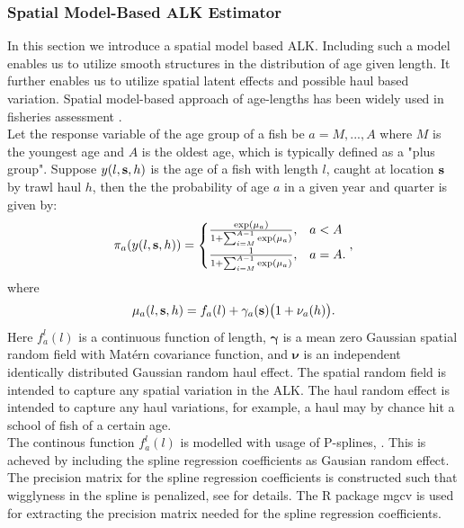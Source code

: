 \documentclass[a4paper 12pt]{article}
\numberwithin{equation}{section}
\begin{document}
\subsubsection{Spatial Model-Based ALK Estimator}
\label{sec:spatialModelALK}
In this section we introduce a spatial model based ALK. Including such a model enables us to utilize smooth structures in the distribution of age given length. It further enables us to utilize spatial latent effects and possible haul based variation. Spatial model-based approach of age-lengths has been widely used in fisheries assessment \citep{berg2012spatial, kvist2000using, rindorf2001analyses}. \\
\indent Let the response variable of the age group of a fish be $a = M,...,A$ where $M$ is the youngest age and $A$ is the oldest age, which is typically defined as a "plus group". Suppose $y(l,{\bf s},h)$ is the age  of a fish with length $l$, caught at location ${\bf s}$ by trawl haul $h$, then the the probability of age $a$ in a given year and quarter is given by:
\begin{align}
\pi_a(y(l,{\bf s},h)) =
\begin{cases}
\frac{\exp(\mu_a)}{1+ \sum_{i = M}^{A-1} \exp(\mu_a)} ,& a<A \\
\frac{1}{1+ \sum_{i = M}^{A-1} \exp(\mu_a)},& a=A.
\end{cases},
\label{model}
\end{align}
where 
\begin{align}\label{eq:linearPred}
\mu_a(l,{\bf s},h) = f_a(l)  + \gamma_a({\bf s}) \big(1+ \nu_a(h)\big).
\end{align}
Here $ f_a^l(l)$ is a continuous function of length, $\pmb{\gamma}$ is a mean zero Gaussian spatial random field with Mat\'{e}rn covariance function, and $\pmb{\nu}$ is an independent identically distributed Gaussian random haul effect. The spatial random field is intended to capture any spatial variation in the ALK. The haul random effect is intended to capture any haul variations, for example, a haul may by chance hit a school of fish of a certain age.\\  
\indent The continous function $f_a^l(l)$ is modelled with usage of P-splines, \citep{wood2017generalized}. This is acheved by including the spline regression coefficients as Gausian random effect. The precision matrix for the spline regression coefficients is constructed such that wigglyness in the spline is penalized, see \citet[page 239]{wood2017generalized} for details. The R package mgcv \citep{wood2015package} is used for extracting the precision matrix needed for the spline regression coefficients.
\end{document}
